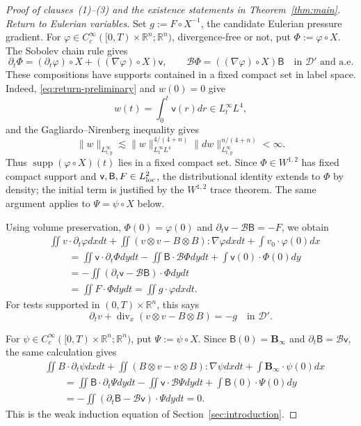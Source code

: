 \documentclass[11pt,reqno]{amsart}
\theoremstyle{plain}
\theoremstyle{definition}
\theoremstyle{remark}
\numberwithin{equation}{section}
\DeclareMathOperator{\Div}{div}
\DeclareMathOperator{\supp}{supp}
\newcommand{\vLag}{\mathsf v}
\newcommand{\BLag}{\mathsf B}
\newcommand{\Binf}{\mathbf B_\infty}
\newcommand{\Real}{\mathbb R}
\newcommand{\Rn}{\Real^n}
\begin{document}
\begin{proof}[Proof of clauses~\textup{(1)}--\textup{(3)} and the existence
statements in Theorem~\ref{thm:main}]
\emph{Return to Eulerian variables.}
Set $g:=F\circ X^{-1}$, the candidate Eulerian pressure gradient. For
$\varphi\in C_c^\infty([0,T)\times\Rn;\Rn)$, divergence-free or not, put
$\Phi:=\varphi\circ X$. The Sobolev chain rule gives
\begin{equation}\label{eq:sobolevchainrule}
 \partial_t\Phi=(\partial_t\varphi)\circ X
 +((\nabla\varphi)\circ X)\vLag,
 \qquad
 \mathcal B\Phi=((\nabla\varphi)\circ X)\BLag
 \quad\text{in }\mathcal D'\text{ and a.e.}
\end{equation}
These compositions have supports contained in a fixed compact set in label
space. Indeed, \eqref{eq:return-preliminary} and $w(0)=0$ give
\[
 w(t)=\int_0^t\vLag(r)dr\in L^\infty_tL^4,
\]
and the Gagliardo--Nirenberg inequality gives
\[
 \|w\|_{L^\infty_{t,y}}
 \lesssim
 \|w\|_{L^\infty_tL^4}^{4/(4+n)}
 \|dw\|_{L^\infty_{t,y}}^{n/(4+n)}<\infty.
\]
Thus $\supp(\varphi\circ X)(t)$ lies in a fixed compact set. Since
$\Phi\in W^{1,2}$ has fixed compact support and
$\vLag,\BLag,F\in L^2_{\rm loc}$, the distributional identity extends to
$\Phi$ by density; the initial term is justified by the $W^{1,2}$ trace
theorem. The same argument applies to $\Psi=\psi\circ X$ below.

Using volume preservation, $\Phi(0)=\varphi(0)$ and
$\partial_t\vLag-\mathcal B\BLag=-F$, we obtain
\begin{equation}\label{eq:return-momentum}
\begin{aligned}
 &\iint v\cdot\partial_t\varphi  dx dt
   +\iint (v\otimes v-B\otimes B):\nabla\varphi  dx dt
   +\int v_0\cdot\varphi(0) dx\\
 &\qquad=\iint \vLag\cdot\partial_t\Phi  dy dt
   -\iint \BLag\cdot\mathcal B\Phi  dy dt
   +\int \vLag(0)\cdot\Phi(0) dy\\
 &\qquad=-\iint(\partial_t\vLag-\mathcal B\BLag)\cdot\Phi  dy dt\\
 &\qquad=\iint F\cdot\Phi  dy dt
 =\iint g\cdot\varphi  dx dt.
\end{aligned}
\end{equation}
For tests supported in $(0,T)\times\Rn$, this says
\[
 \partial_tv+\Div_x(v\otimes v-B\otimes B)=-g
 \quad\text{in }\mathcal D'.
\]

For $\psi\in C_c^\infty([0,T)\times\Rn;\Rn)$, put
$\Psi:=\psi\circ X$. Since $\BLag(0)=\Binf$ and
$\partial_t\BLag=\mathcal B\vLag$, the same calculation gives
\begin{equation}\label{eq:return-induction}
\begin{aligned}
 &\iint B\cdot\partial_t\psi  dx dt
   +\iint (B\otimes v-v\otimes B):\nabla\psi  dx dt
   +\int\Binf\cdot\psi(0) dx\\
 &\qquad=\iint \BLag\cdot\partial_t\Psi  dy dt
   -\iint \vLag\cdot\mathcal B\Psi  dy dt
   +\int\BLag(0)\cdot\Psi(0) dy\\
 &\qquad=-\iint(\partial_t\BLag-\mathcal B\vLag)\cdot\Psi  dy dt=0.
\end{aligned}
\end{equation}
This is the weak induction equation of Section~\ref{sec:introduction}.


\end{proof}
\end{document}
